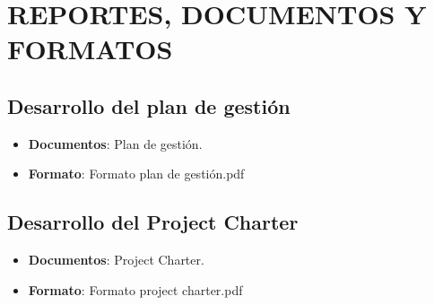 \chapter{REPORTES, DOCUMENTOS Y FORMATOS}
%
\section{Desarrollo del plan de gesti\'on}
%
\begin{itemize}
	\item \textbf{Documentos}: Plan de gesti\'on.
	\item \textbf{Formato}: Formato plan de gesti\'on.pdf
\end{itemize}
%
\section{Desarrollo del Project Charter}
%
\begin{itemize}
	\item \textbf{Documentos}: Project Charter.
	\item \textbf{Formato}: Formato project charter.pdf
\end{itemize}